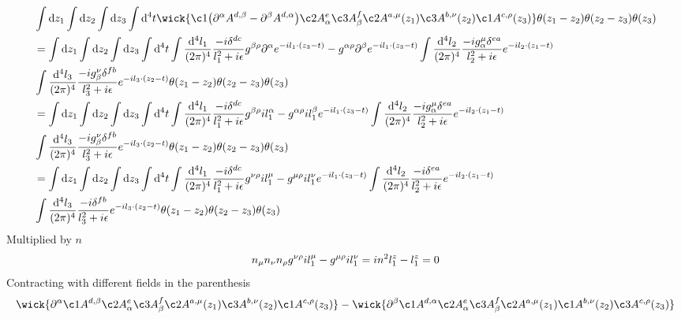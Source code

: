 \documentclass{article}
\DeclarePairedDelimiter\bracketM{[}{]}
\let\bqty\relax
\newcommand{\bqty}[1]{\bracketM*{#1}}
\newcommand{\mm}[1]{\frac{\dd^4#1}{(2\pi)^4}}
\begin{document}
\begin{align*}
	&\int\dd z_1\int\dd z_2\int\dd z_3\int\dd^4 t\wick{\c1{\left(\partial^{\alpha} A^{d,\beta}-\partial^{\beta} A^{d,\alpha}\right)} \c2A^{e}_{\alpha} \c3A^{f}_{\beta}\c2A^{a,\mu}(z_1)\c3A^{b,\nu}(z_2)\c1A^{c,\rho}(z_3)}\theta(z_1-z_2)\theta(z_2-z_3)\theta(z_3)\\ 
	&=\int\dd z_1\int\dd z_2\int\dd z_3\int\dd^4 t
	\int\mm{l_1}\frac{-i\delta^{dc}}{l_1^2+i\epsilon}\bqty{g^{\beta\rho}\partial^{\alpha}e^{-il_1\cdot(z_3-t)}-g^{\alpha\rho}\partial^{\beta}e^{-il_1\cdot(z_3-t)}}
	\int\mm{l_2}\frac{-ig_{\alpha}^{\mu}\delta^{ea}}{l_2^2+i\epsilon}e^{-il_2\cdot(z_1-t)}\\&
	\int\mm{l_3}\frac{-ig_{\beta}^{\nu}\delta^{fb}}{l_3^2+i\epsilon}e^{-il_3\cdot(z_2-t)}
	\theta(z_1-z_2)\theta(z_2-z_3)\theta(z_3)\\ 
	&=\int\dd z_1\int\dd z_2\int\dd z_3\int\dd^4 t
	\int\mm{l_1}\frac{-i\delta^{dc}}{l_1^2+i\epsilon}\bqty{g^{\beta\rho}il_1^{\alpha}-g^{\alpha\rho}il_1^{\beta}}e^{-il_1\cdot(z_3-t)}
	\int\mm{l_2}\frac{-ig_{\alpha}^{\mu}\delta^{ea}}{l_2^2+i\epsilon}e^{-il_2\cdot(z_1-t)}\\&
	\int\mm{l_3}\frac{-ig_{\beta}^{\nu}\delta^{fb}}{l_3^2+i\epsilon}e^{-il_3\cdot(z_2-t)}
	\theta(z_1-z_2)\theta(z_2-z_3)\theta(z_3)\\ 
	&=\int\dd z_1\int\dd z_2\int\dd z_3\int\dd^4 t
	\int\mm{l_1}\frac{-i\delta^{dc}}{l_1^2+i\epsilon}\bqty{g^{\nu\rho}il_1^{\mu}-g^{\mu\rho}il_1^{\nu}}e^{-il_1\cdot(z_3-t)}
	\int\mm{l_2}\frac{-i\delta^{ea}}{l_2^2+i\epsilon}e^{-il_2\cdot(z_1-t)}\\&
	\int\mm{l_3}\frac{-i\delta^{fb}}{l_3^2+i\epsilon}e^{-il_3\cdot(z_2-t)}
	\theta(z_1-z_2)\theta(z_2-z_3)\theta(z_3)
\end{align*}
Multiplied by $n$
\begin{align*}
	n_{\mu}n_{\nu}n_{\rho}\bqty{g^{\nu\rho}il_1^{\mu}-g^{\mu\rho}il_1^{\nu}}=in^2\bqty{l_1^z-l_1^z}=0
\end{align*}
Contracting with different fields in the parenthesis
\begin{align*}
	\wick{\partial^{\alpha} \c1A^{d,\beta} \c2A^{e}_{\alpha} \c3A^{f}_{\beta}\c2A^{a,\mu}(z_1)\c3A^{b,\nu}(z_2)\c1A^{c,\rho}(z_3)}-\wick{\partial^{\beta} \c1A^{d,\alpha} \c2A^{e}_{\alpha} \c3A^{f}_{\beta}\c2A^{a,\mu}(z_1)\c1A^{b,\nu}(z_2)\c3A^{c,\rho}(z_3)}
\end{align*}
\end{document}
